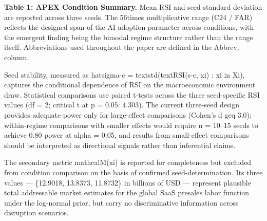 \documentclass[10pt, conference]{IEEEtran}
\begin{document}
\textbf{Table 1: APEX Condition Summary.} Mean RSI and seed standard deviation are reported across three seeds. The 56times multiplicative range (C24 / FAR) reflects the designed span of the AI adoption parameter across conditions, with the emergent finding being the bimodal regime structure rather than the range itself. Abbreviations used throughout the paper are defined in the Abbrev. column.

\begin{table}[ht]
\centering
\caption{Comparison of Abbrev. across Condition Label, Descriptive Name, Mean RSI, Seed Std}
\label{tab:3}
\end{table}

Seed stability, measured as hatsigma-c = textstd(textRSI(s-c, xi) : xi in Xi), captures the conditional dependence of RSI on the macroeconomic environment draw. Statistical comparisons use paired t-tests across the three seed-specific RSI values (df = 2; critical t at p = 0.05: 4.303). The current three-seed design provides adequate power only for large-effect comparisons (Cohen's d geq 3.0); within-regime comparisons with smaller effects would require n = 10--15 seeds to achieve 0.80 power at alpha = 0.05, and results from small-effect comparisons should be interpreted as directional signals rather than inferential claims.

The secondary metric mathcalM(xi) is reported for completeness but excluded from condition comparison on the basis of confirmed seed-determination. Its three values --- \{12.9018, 13.8373, 11.8732\} in billions of USD --- represent plausible total addressable market estimates for the global SaaS presales labor function under the log-normal prior, but carry no discriminative information across disruption scenarios.
\end{document}

